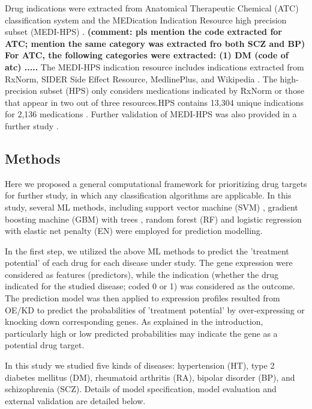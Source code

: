     Drug indications were extracted from Anatomical Therapeutic Chemical (ATC) classification system and the MEDication Indication Resource high precision subset (MEDI-HPS) \cite{wei2013development}. \textbf{(comment: pls mention the code extracted for ATC; mention the same category was extracted fro both SCZ and BP) 
    For ATC,  the following categories were extracted: (1) DM (code of atc) .....}
    The MEDI-HPS indication resource includes indications extracted from RxNorm, SIDER Side Effect Resource, MedlinePlus, and Wikipedia \cite{wei2013development}. The high-precision subset (HPS) only considers medications indicated by RxNorm or those that appear in two out of three resources.HPS contains 13,304 unique indications for 2,136 medications \cite{wei2013development}. Further validation of MEDI-HPS was also provided in a further study \cite{wei2013validation}. 

  \subsection{Methods}
    Here we proposed a general computational framework for prioritizing drug targets for further study, in which any classification algorithms are applicable. In this study, several ML methods, including support vector machine (SVM) \cite{cortes1995support}, gradient boosting machine (GBM) with trees \cite{friedman2001greedy}, random forest (RF) \cite{breiman2001random} and logistic regression with elastic net penalty (EN) \cite{zou2005regularization} were employed for prediction modelling. 

    In the first step, we utilized the above ML methods to predict the 'treatment potential' of each drug for each disease under study. The gene expression were considered as features (predictors), while the indication (whether the drug indicated for the studied disease; coded 0 or 1) was considered as the outcome.  The prediction model was then applied to expression profiles resulted from OE/KD to predict the probabilities of 'treatment potential' by over-expressing or knocking down corresponding genes. As explained in the introduction, particularly high or low predicted probabilities may indicate the gene as a potential drug target. 

    In this study we studied five kinds of diseases: hypertension (HT), type 2 diabetes mellitus (DM), rheumatoid arthritis (RA), bipolar disorder (BP), and schizophrenia (SCZ). Details of model specification, model evaluation and external validation are detailed below. 

